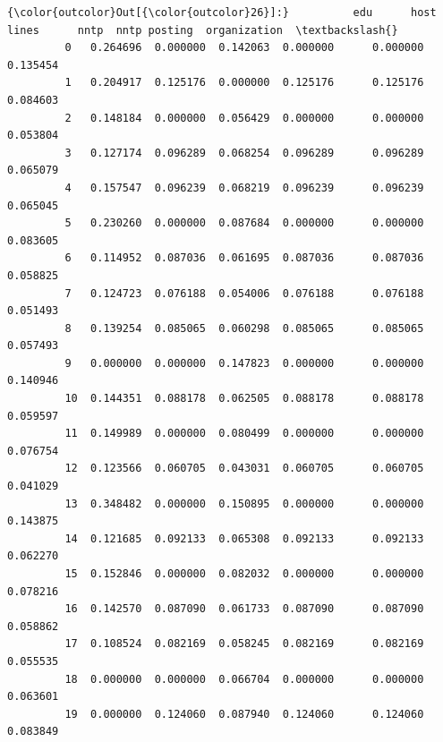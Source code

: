 \documentclass[11pt]{article}
\begin{document}
\begin{Verbatim}[commandchars=\\\{\}]
{\color{outcolor}Out[{\color{outcolor}26}]:}          edu      host     lines      nntp  nntp posting  organization  \textbackslash{}
         0   0.264696  0.000000  0.142063  0.000000      0.000000      0.135454   
         1   0.204917  0.125176  0.000000  0.125176      0.125176      0.084603   
         2   0.148184  0.000000  0.056429  0.000000      0.000000      0.053804   
         3   0.127174  0.096289  0.068254  0.096289      0.096289      0.065079   
         4   0.157547  0.096239  0.068219  0.096239      0.096239      0.065045   
         5   0.230260  0.000000  0.087684  0.000000      0.000000      0.083605   
         6   0.114952  0.087036  0.061695  0.087036      0.087036      0.058825   
         7   0.124723  0.076188  0.054006  0.076188      0.076188      0.051493   
         8   0.139254  0.085065  0.060298  0.085065      0.085065      0.057493   
         9   0.000000  0.000000  0.147823  0.000000      0.000000      0.140946   
         10  0.144351  0.088178  0.062505  0.088178      0.088178      0.059597   
         11  0.149989  0.000000  0.080499  0.000000      0.000000      0.076754   
         12  0.123566  0.060705  0.043031  0.060705      0.060705      0.041029   
         13  0.348482  0.000000  0.150895  0.000000      0.000000      0.143875   
         14  0.121685  0.092133  0.065308  0.092133      0.092133      0.062270   
         15  0.152846  0.000000  0.082032  0.000000      0.000000      0.078216   
         16  0.142570  0.087090  0.061733  0.087090      0.087090      0.058862   
         17  0.108524  0.082169  0.058245  0.082169      0.082169      0.055535   
         18  0.000000  0.000000  0.066704  0.000000      0.000000      0.063601   
         19  0.000000  0.124060  0.087940  0.124060      0.124060      0.083849   
         

\end{Verbatim}
\end{document}
